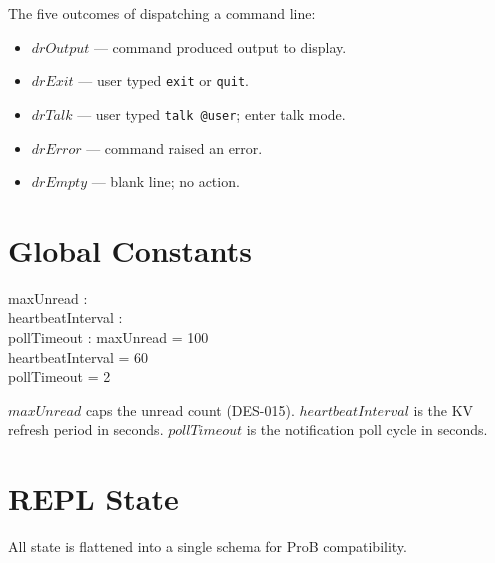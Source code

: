 \documentclass[a4paper,10pt,fleqn]{article}
\begin{document}
The five outcomes of dispatching a command line:
\begin{itemize}
\item $drOutput$ --- command produced output to display.
\item $drExit$ --- user typed \texttt{exit} or \texttt{quit}.
\item $drTalk$ --- user typed \texttt{talk @user}; enter talk mode.
\item $drError$ --- command raised an error.
\item $drEmpty$ --- blank line; no action.
\end{itemize}

\section{Global Constants}

\begin{axdef}
  maxUnread : \nat \\
  heartbeatInterval : \nat \\
  pollTimeout : \nat
\where
  maxUnread = 100 \\
  heartbeatInterval = 60 \\
  pollTimeout = 2
\end{axdef}

$maxUnread$ caps the unread count (DES-015).  $heartbeatInterval$
is the KV refresh period in seconds.  $pollTimeout$ is the
notification poll cycle in seconds.

\section{REPL State}

All state is flattened into a single schema for ProB compatibility.
\end{document}
